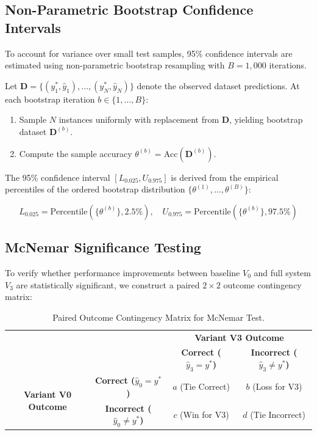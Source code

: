 \subsection{Non-Parametric Bootstrap Confidence Intervals}

To account for variance over small test samples, 95\% confidence intervals are estimated using non-parametric bootstrap resampling with $B = 1,000$ iterations.

Let $\mathbf{D} = \{(y_1^*, \hat{y}_1), \dots, (y_N^*, \hat{y}_N)\}$ denote the observed dataset predictions. At each bootstrap iteration $b \in \{1, \dots, B\}$:
\begin{enumerate}
    \item Sample $N$ instances uniformly with replacement from $\mathbf{D}$, yielding bootstrap dataset $\mathbf{D}^{(b)}$.
    \item Compute the sample accuracy $\theta^{(b)} = \text{Acc}(\mathbf{D}^{(b)})$.
\end{enumerate}

The 95\% confidence interval $[L_{0.025}, U_{0.975}]$ is derived from the empirical percentiles of the ordered bootstrap distribution $\{\theta^{(1)}, \dots, \theta^{(B)}\}$:

\begin{equation}
    L_{0.025} = \text{Percentile}\left( \{\theta^{(b)}\}, 2.5\% \right), \quad U_{0.975} = \text{Percentile}\left( \{\theta^{(b)}\}, 97.5\% \right)
\end{equation}

\subsection{McNemar Significance Testing}

To verify whether performance improvements between baseline $V_0$ and full system $V_3$ are statistically significant, we construct a paired $2 \times 2$ outcome contingency matrix:

\begin{table}[h!]
\centering
\caption{Paired Outcome Contingency Matrix for McNemar Test.}
\label{tab:mcnemar_table}
\small
\begin{tabular}{c c c c}
\toprule
 & & \multicolumn{2}{c}{\textbf{Variant V3 Outcome}} \\
 & & \textbf{Correct ($\hat{y}_3 = y^*$)} & \textbf{Incorrect ($\hat{y}_3 \neq y^*$)} \\
\midrule
\multirow{2}{*}{\textbf{Variant V0 Outcome}} & \textbf{Correct ($\hat{y}_0 = y^*$)} & $a$ (Tie Correct) & $b$ (Loss for V3) \\
 & \textbf{Incorrect ($\hat{y}_0 \neq y^*$)} & $c$ (Win for V3) & $d$ (Tie Incorrect) \\
\bottomrule
\end{tabular}
\end{table}


